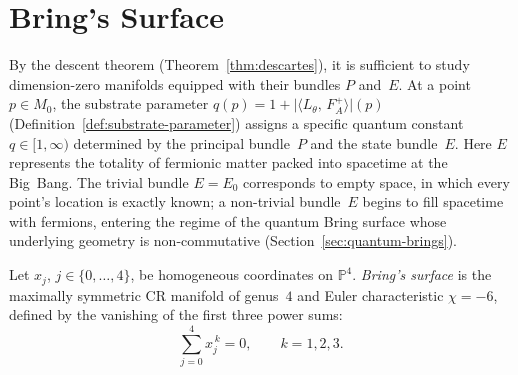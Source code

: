 
\chapter{Bring's Surface}
\label{chap:brings-surface}

\begin{remark}
\label{rem:descent-to-zero}
By the descent theorem (Theorem~\ref{thm:descartes}), it is sufficient
to study dimension-zero manifolds equipped with their bundles $P$ and~$E$.
At a point $p\in M_0$, the substrate parameter
$q(p)= 1 + \lvert\langle L_\theta,\, F_A^{+}\rangle\rvert(p)$
(Definition~\ref{def:substrate-parameter}) assigns a specific quantum
constant $q\in[1,\infty)$ determined by the principal bundle~$P$ and the
state bundle~$E$.  Here $E$ represents the totality of fermionic matter
packed into spacetime at the Big~Bang.  The trivial bundle $E=E_0$
corresponds to empty space, in which every point's location is exactly
known; a non-trivial bundle~$E$ begins to fill spacetime with fermions,
entering the regime of the quantum Bring surface whose underlying geometry
is non-commutative (Section~\ref{sec:quantum-brings}).
\end{remark}

\begin{definition}
\label{def:brings-surface}
Let $x_j$, $j\in\{0,\dots,4\}$, be homogeneous coordinates on
$\mathbb{P}^4$.  \emph{Bring's surface} is the maximally symmetric CR
manifold of genus~$4$ and Euler characteristic $\chi=-6$, defined by the
vanishing of the first three power sums:
\[
  \sum_{j=0}^{4}x_j^{\,k}=0,
  \qquad k=1,2,3.
\]
\end{definition}

